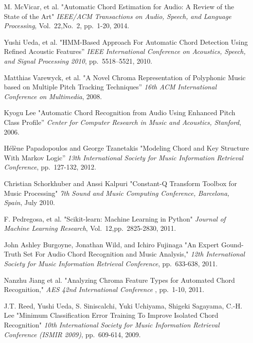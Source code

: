 \documentclass{article}
\begin{document}
\begin{thebibliography}{citations}

M. McVicar, et al.
"Automatic Chord Estimation for Audio: A Review of the State of the Art"
{\it IEEE/ACM Transactions on Audio, Speech, and Language Processing},
Vol.~22,No.~2, pp.~1-20, 2014.

Yushi Ueda, et al.
"HMM-Based Approach For Automatic Chord Detection Using Refined Acoustic Features''
{\it IEEE International Conference on Acoustics, Speech, and Signal Processing 2010},
pp.~5518--5521, 2010.

Matthias Varewyck, et al.
"A Novel Chroma Representation of Polyphonic Music based on Multiple Pitch
Tracking Techniques''
{\it 16th ACM International Conference on Multimedia},
2008.

Kyogu Lee
"Automatic Chord Recognition from Audio Using Enhanced Pitch Class Profile''
{\it Center for Computer Research in Music and Acoustics, Stanford},
2006.

Hélène Papadopoulos and George Tzanetakis
"Modeling Chord and Key Structure With Markov Logic''
{\it 13th International Society for Music Information Retrieval Conference},
pp.~127-132, 2012.

Christian Schorkhuber and Anssi Kalpuri
"Constant-Q Transform Toolbox for Music Processing"
{\it 7th Sound and Music Computing Conference, Barcelona, Spain},
July 2010.

F. Pedregosa, et al.
"Scikit-learn: Machine Learning in Python"
{\it Journal of Machine Learning Research},
Vol.~12,pp.~2825-2830, 2011.

John Ashley Burgoyne, Jonathan Wild, and Ichiro Fujinaga
"An Expert Gound-Truth Set For Audio Chord Recognition and Music Analysis,"
{\it 12th International Society for Music Information Retrieval Conference},
pp.~633-638, 2011.

Nanzhu Jiang et al.
"Analyzing Chroma Feature Types for Automated Chord Recognition,"
{\it AES 42nd International Conference },
pp.~1-10, 2011.

J.T. Reed, Yushi Ueda, S. Siniscalchi, Yuki Uchiyama, Shigeki Sagayama, C.-H. Lee
"Minimum Classification Error Training To Improve Isolated Chord Recognition"
{\it 10th International Society for Music Information Retrieval Conference (ISMIR 2009)},
pp.~609-614, 2009.


\end{thebibliography}
\end{document}
